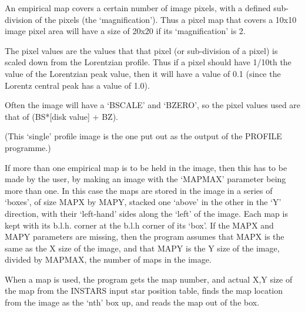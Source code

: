 \begin{small}
{{  An empirical map covers a certain number of image pixels, with
  a defined sub-division of the pixels (the `magnification'). Thus
  a pixel map that covers a 10x10 image pixel area will have a
  size of 20x20 if its `magnification' is 2.

  The pixel values are the values that that pixel (or sub-division of
  a pixel) is scaled down from the Lorentzian profile. Thus if a
  pixel should have 1/10th the value of the Lorentzian peak value,
  then it will have a value of 0.1 (since the Lorentz central peak
  has a value of 1.0).

  Often the image will have a `BSCALE' and `BZERO', so the pixel
  values used are  that of (BS*[disk value] + BZ).

  (This `single' profile image is the one put out as the output of the
  PROFILE programme.)

  If more than one empirical map is to be held in the image, then
  this has to be made by the user, by making an image with the `MAPMAX'
  parameter being more than one. In this case the maps are stored in
  the image in a series of `boxes', of size MAPX by MAPY, stacked one
  `above' in the other in the `Y' direction, with their `left-hand' sides
  along the `left' of the image. Each map is kept with its
  b.l.h. corner at the b.l.h corner of its `box'. If the MAPX and
  MAPY parameters are missing, then the program assumes that MAPX is
  the same as the X size of the image, and that MAPY is the Y size
  of the image, divided by MAPMAX, the number of maps in the image.

  When a map is used, the program gets the map number, and actual
  X,Y size of the map from the INSTARS input star position table,
  finds the map location from the image as the `nth' box up, and
  reads the map out of the box.


}}
\end{small}
